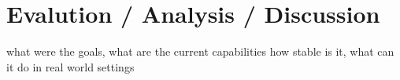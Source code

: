 \chapter{Evalution / Analysis / Discussion}


what were the goals, what are the current capabilities
\newline
how stable is it, what can it do in real world settings
